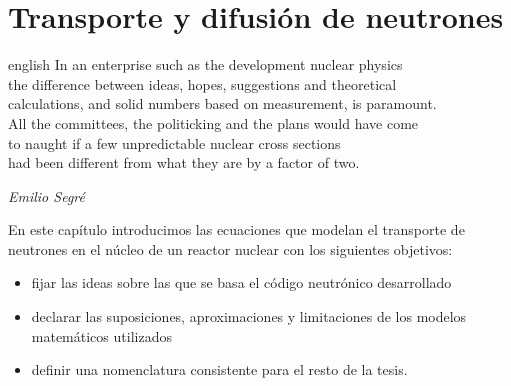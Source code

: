 \chapter{Transporte y difusión de neutrones}
\label{cap:transporte}

\begin{chapterquote}[0.75\linewidth]
\begin{foreignlanguage}{english}
In an enterprise such as the development nuclear physics\\
the difference between ideas, hopes, suggestions and theoretical\\
calculations, and solid numbers based on measurement, is paramount.\\
All the committees, the politicking and the plans would have come\\
to naught if a few unpredictable nuclear cross sections\\
had been different from what they are by a factor of two.\\
\end{foreignlanguage}

\smallskip

\textit{Emilio Segré}
\end{chapterquote}

\noindent
En este capítulo introducimos las ecuaciones que modelan el transporte de neutrones en el núcleo de un reactor nuclear con los siguientes objetivos:

\begin{itemize}
 \item fijar las ideas sobre las que se basa el código neutrónico desarrollado
 \item declarar las suposiciones, aproximaciones y limitaciones de los modelos matemáticos utilizados
 \item definir una nomenclatura consistente para el resto de la tesis.
\end{itemize}

